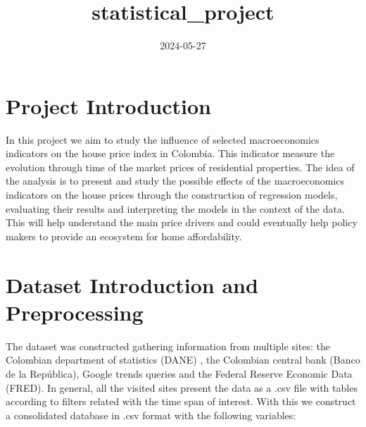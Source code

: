 \documentclass[
]{article}
\title{statistical\_project}
\author{}
\date{\vspace{-2.5em}2024-05-27}
\begin{document}
\maketitle

\section{Project Introduction}\label{project-introduction}

In this project we aim to study the influence of selected macroeconomics
indicators on the house price index in Colombia. This indicator measure
the evolution through time of the market prices of residential
properties. The idea of the analysis is to present and study the
possible effects of the macroeconomics indicators on the house prices
through the construction of regression models, evaluating their results
and interpreting the models in the context of the data. This will help
understand the main price drivers and could eventually help policy
makers to provide an ecosystem for home affordability.

\section{Dataset Introduction and
Preprocessing}\label{dataset-introduction-and-preprocessing}

The dataset was constructed gathering information from multiple sites:
the Colombian department of statistics (DANE) , the Colombian central
bank (Banco de la República), Google trends queries and the Federal
Reserve Economic Data (FRED). In general, all the visited sites present
the data as a .csv file with tables according to filters related with
the time span of interest. With this we construct a consolidated
database in .csv format with the following variables:
\end{document}
